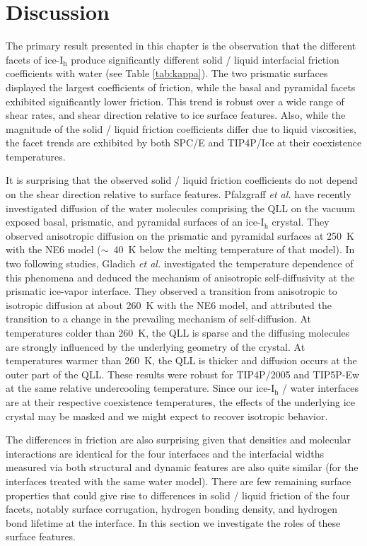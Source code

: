  
\section{Discussion}
The primary result presented in this chapter is the observation that
the different facets of ice-I$_\mathrm{h}$ produce significantly
different solid / liquid interfacial friction coefficients with water
(see Table \ref{tab:kappa}).  The two prismatic surfaces displayed the
largest coefficients of friction, while the basal and pyramidal facets
exhibited significantly lower friction. This trend is robust over a
wide range of shear rates, and shear direction relative to ice surface
features. Also, while the magnitude of the solid / liquid friction
coefficients differ due to liquid viscosities, the facet trends are
exhibited by both SPC/E and TIP4P/Ice at their coexistence
temperatures.

It is surprising that the observed solid / liquid friction
coefficients do not depend on the shear direction relative to surface
features. Pfalzgraff \textit{et al.} have recently investigated
diffusion of the water molecules comprising the QLL on the vacuum
exposed basal, prismatic, and pyramidal surfaces of an
ice-I$_\mathrm{h}$ crystal.\cite{Pfalzgraff2011} They observed
anisotropic diffusion on the prismatic and pyramidal surfaces at 250~K
with the NE6 model ($\sim$~40~K below the melting temperature of that
model). In two following studies, Gladich \textit{et al.}
investigated the temperature dependence of this phenomena and deduced
the mechanism of anisotropic self-diffusivity at the prismatic
ice-vapor interface.\cite{Gladich2011,Gladich2015} They observed a
transition from anisotropic to isotropic diffusion at about 260~K with
the NE6 model, and attributed the transition to a change in the
prevailing mechanism of self-diffusion. At temperatures colder than
260~K, the QLL is sparse and the diffusing molecules are strongly
influenced by the underlying geometry of the crystal. At temperatures
warmer than 260~K, the QLL is thicker and diffusion occurs at the
outer part of the QLL. These results were robust for TIP4P/2005 and
TIP5P-Ew at the same relative undercooling temperature. Since our
ice-I$_\mathrm{h}$ / water interfaces are at their respective
coexistence temperatures, the effects of the underlying ice crystal
may be masked and we might expect to recover isotropic behavior.

The differences in friction are also surprising given that densities
and molecular interactions are identical for the four interfaces and
the interfacial widths measured via both structural and dynamic
features are also quite similar (for the interfaces treated with the
same water model). There are few remaining surface properties that
could give rise to differences in solid / liquid friction of the four
facets, notably surface corrugation, hydrogen bonding density, and
hydrogen bond lifetime at the interface. In this section we
investigate the roles of these surface features.


